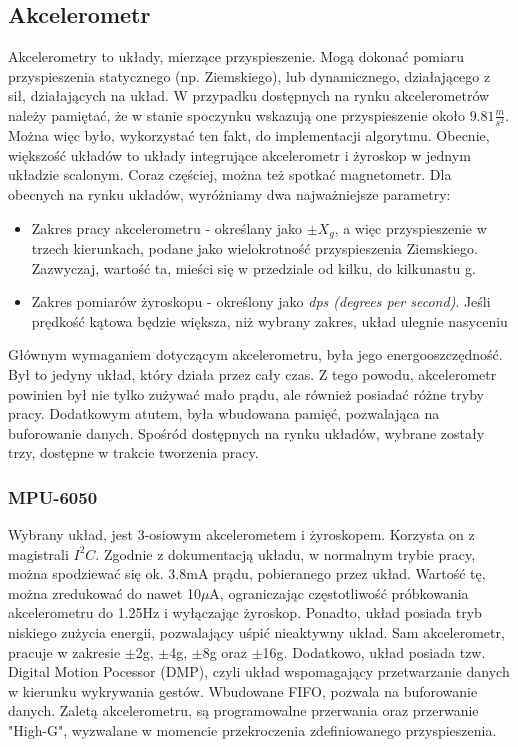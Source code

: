 \subsection{Akcelerometr}
Akcelerometry to układy, mierzące przyspieszenie. Mogą dokonać pomiaru przyspieszenia statycznego (np. Ziemskiego), lub dynamicznego, działającego z sił, działających na układ. W przypadku dostępnych na rynku akcelerometrów należy pamiętać, że w stanie spoczynku wskazują one przyspieszenie około $9.81\frac{m}{s^{2}}$. Można więc było, wykorzystać ten fakt, do implementacji algorytmu.
\newline
Obecnie, większość układów to układy integrujące akcelerometr i żyroskop w jednym układzie scalonym. Coraz częściej, można też spotkać magnetometr. Dla obecnych na rynku układów, wyróżniamy dwa najważniejsze parametry:
\begin{itemize}
    \item Zakres pracy akcelerometru - określany jako $\pm X_{g}$, a więc przyspieszenie w trzech kierunkach, podane jako wielokrotność przyspieszenia Ziemskiego. Zazwyczaj, wartość ta, mieści się w przedziale od kilku, do kilkunastu g.
    \item Zakres pomiarów żyroskopu - określony jako \emph{dps (degrees per second)}. Jeśli prędkość kątowa będzie większa, niż wybrany zakres, układ ulegnie nasyceniu
\end{itemize}
Głównym wymaganiem dotyczącym akcelerometru, była jego energooszczędność. Był to jedyny układ, który działa przez cały czas. Z tego powodu, akcelerometr powinien był nie tylko zużywać mało prądu, ale również posiadać różne tryby pracy. Dodatkowym atutem, była wbudowana pamięć, pozwalająca na buforowanie danych.
\newline
Spośród dostępnych na rynku układów, wybrane zostały trzy, dostępne w trakcie tworzenia pracy.

\subsubsection{MPU-6050}
Wybrany układ, jest 3-osiowym akcelerometem i żyroskopem. Korzysta on z magistrali $I^{2}C$. Zgodnie z dokumentacją układu, w normalnym trybie pracy, można spodziewać się ok. 3.8mA prądu, pobieranego przez układ.\cite{MPU6050} Wartość tę, można zredukować do nawet 10$\mu$A, ograniczając częstotliwość próbkowania akcelerometru do 1.25Hz i wyłączając żyroskop. Ponadto, układ posiada tryb niskiego zużycia energii, pozwalający uśpić nieaktywny układ. Sam akcelerometr, pracuje w zakresie $\pm$2g, $\pm$4g, $\pm$8g oraz $\pm$16g. Dodatkowo, układ posiada tzw. Digital Motion Pocessor (DMP), czyli układ wspomagający przetwarzanie danych w kierunku wykrywania gestów. Wbudowane FIFO, pozwala na buforowanie danych. Zaletą akcelerometru, są programowalne przerwania oraz przerwanie "High-G", wyzwalane w momencie przekroczenia zdefiniowanego przyspieszenia.

